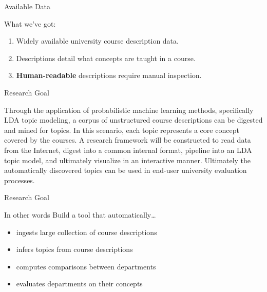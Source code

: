 \documentclass[10pt, compress]{beamer}
\begin{document}
\begin{frame}{Available Data}
  \begin{block}{What we've got:}
    \onslide<+->
    \begin{enumerate}[<+- | alert@+>]
      \item Widely available university course description data.
      \item Descriptions detail what concepts are taught in a course.
      \item \textbf{Human-readable} descriptions require manual inspection.
    \end{enumerate}
  \end{block}

  \vfill


\end{frame}


\begin{frame}{Research Goal}

  \vfill
  Through the application of probabilistic machine learning methods,
  specifically LDA topic modeling, a corpus of unstructured course
  descriptions can be digested and mined for topics. In this scenario,
  each topic represents a core concept covered by the courses.
  \vfill
  A research framework will be constructed to read data from the
  Internet, digest into a common internal format, pipeline into an LDA
  topic model, and ultimately visualize in an interactive manner.
  \vfill
  Ultimately the automatically discovered topics can be used in end-user
  university evaluation processes.
  \vfill
\end{frame}


\begin{frame}{Research Goal}

  \begin{block}{In other words}
    Build a tool that automatically\ldots
    \onslide<+->
    \begin{itemize}[<+- | alert@+>]
      \item ingests large collection of course descriptions
      \item infers topics from course descriptions
      \item computes comparisons between departments
      \item evaluates departments on their concepts
    \end{itemize}
  \end{block}

\end{frame}
\end{document}
